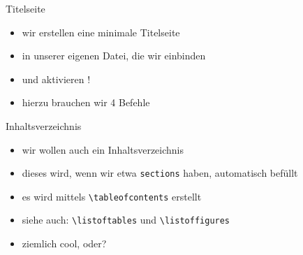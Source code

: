 \begin{frame}{Titelseite}
\begin{itemize}[<+->]
    \item wir erstellen eine minimale Titelseite
    \item in unserer eigenen Datei, die wir einbinden
    \item und aktivieren !
    \item hierzu brauchen wir 4 Befehle
\end{itemize}
\end{frame}

\begin{frame}[fragile]{Inhaltsverzeichnis}
    \begin{itemize}[<+->]
        \item wir wollen auch ein Inhaltsverzeichnis
        \item dieses wird, wenn wir etwa \texttt{sections} haben, automatisch befüllt
        \item es wird mittels \lstinline|\tableofcontents| erstellt
        \item siehe auch: \lstinline|\listoftables| und \lstinline|\listoffigures|
        \item ziemlich cool, oder?
    \end{itemize}
\end{frame}

